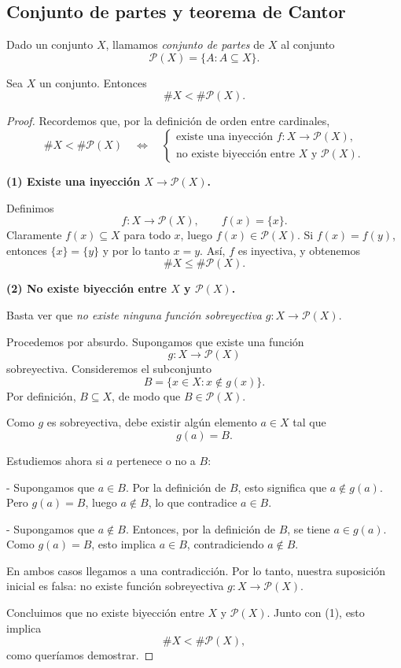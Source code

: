 \subsection{Conjunto de partes y teorema de Cantor}

\begin{defi}
Dado un conjunto $X$, llamamos \emph{conjunto de partes} de $X$ al conjunto
\[
\mathcal{P}(X) = \{ A : A \subseteq X\}.
\]
\end{defi}

\begin{teo}[Cantor]
Sea $X$ un conjunto. Entonces
\[
\#X < \#\mathcal{P}(X).
\]
\end{teo}

\begin{proof}
Recordemos que, por la definición de orden entre cardinales,
\[
\#X < \#\mathcal{P}(X)
\quad\Longleftrightarrow\quad
\begin{cases}
\text{existe una inyección } f : X \to \mathcal{P}(X),\\
\text{no existe biyección entre } X \text{ y } \mathcal{P}(X).
\end{cases}
\]

\textbf{(1) Existe una inyección $X \to \mathcal{P}(X)$.}

Definimos
\[
f : X \longrightarrow \mathcal{P}(X), \qquad f(x) = \{x\}.
\]
Claramente $f(x) \subseteq X$ para todo $x$, luego $f(x) \in \mathcal{P}(X)$.
Si $f(x) = f(y)$, entonces $\{x\} = \{y\}$ y por lo tanto $x = y$.
Así, $f$ es inyectiva, y obtenemos
\[
\#X \le \#\mathcal{P}(X).
\]

\textbf{(2) No existe biyección entre $X$ y $\mathcal{P}(X)$.}

Basta ver que \emph{no existe ninguna función sobreyectiva}
$g : X \to \mathcal{P}(X)$.

Procedemos por absurdo. Supongamos que existe una función
\[
g : X \longrightarrow \mathcal{P}(X)
\]
sobreyectiva. Consideremos el subconjunto
\[
B = \{ x \in X : x \notin g(x) \}.
\]
Por definición, $B \subseteq X$, de modo que $B \in \mathcal{P}(X)$.

Como $g$ es sobreyectiva, debe existir algún elemento $a \in X$ tal que
\[
g(a) = B.
\]

Estudiemos ahora si $a$ pertenece o no a $B$:

- Supongamos que $a \in B$.  
  Por la definición de $B$, esto significa que $a \notin g(a)$. Pero
  $g(a) = B$, luego $a \notin B$, lo que contradice $a \in B$.

- Supongamos que $a \notin B$.  
  Entonces, por la definición de $B$, se tiene $a \in g(a)$. Como
  $g(a) = B$, esto implica $a \in B$, contradiciendo $a \notin B$.

En ambos casos llegamos a una contradicción. Por lo tanto, nuestra
suposición inicial es falsa: no existe función sobreyectiva
$g : X \to \mathcal{P}(X)$.

Concluimos que no existe biyección entre $X$ y $\mathcal{P}(X)$.
Junto con (1), esto implica
\[
\#X < \#\mathcal{P}(X),
\]
como queríamos demostrar.
\end{proof}

